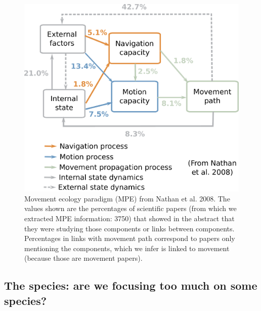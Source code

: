 \documentclass[9pt,twocolumn,twoside,lineno]{pnas-new}
\begin{document}
\begin{figure}%
\centering
\includegraphics[width=.8\linewidth]{./img/MovEcoFrame.pdf}
\caption{Movement ecology paradigm (MPE) from Nathan et al. 2008. The values shown are the percentages of scientific papers (from which we extracted MPE information: 3750) that showed in the abstract that they were studying those components or links between components. Percentages in links with movement path correspond to papers only mentioning the components, which we infer is linked to movement (because those are movement papers). }
\label{fig:mpe}
\end{figure}

\subsection*{The species: are we focusing too much on some species?}
\end{document}
